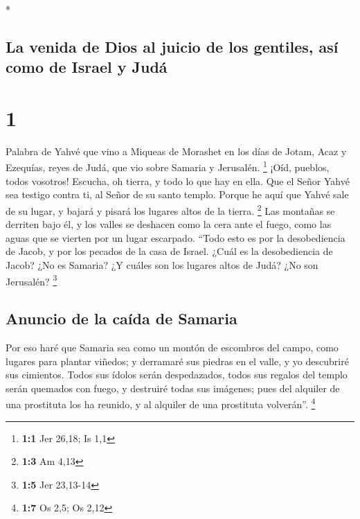 \begin{paracol}{2} \switchcolumn[0]*

\hypertarget{la-venida-de-dios-al-juicio-de-los-gentiles-asuxed-como-de-israel-y-juduxe1}{%
\subsection{La venida de Dios al juicio de los gentiles, así como de
Israel y
Judá}\label{la-venida-de-dios-al-juicio-de-los-gentiles-asuxed-como-de-israel-y-juduxe1}}

\hypertarget{section}{%
\section{1}\label{section}}

 Palabra de Yahvé que vino a Miqueas de Morashet en los
días de Jotam, Acaz y Ezequías, reyes de Judá, que vio sobre Samaria y
Jerusalén. \footnote{\textbf{1:1} Jer 26,18; Is 1,1} 
¡Oíd, pueblos, todos vosotros! Escucha, oh tierra, y todo lo que hay en
ella. Que el Señor Yahvé sea testigo contra ti, al Señor de su santo
templo.  Porque he aquí que Yahvé sale de su lugar, y
bajará y pisará los lugares altos de la tierra. \footnote{\textbf{1:3}
  Am 4,13}  Las montañas se derriten bajo él, y los valles
se deshacen como la cera ante el fuego, como las aguas que se vierten
por un lugar escarpado.  ``Todo esto es por la
desobediencia de Jacob, y por los pecados de la casa de Israel. ¿Cuál es
la desobediencia de Jacob? ¿No es Samaria? ¿Y cuáles son los lugares
altos de Judá? ¿No son Jerusalén? \footnote{\textbf{1:5} Jer 23,13-14}

\hypertarget{anuncio-de-la-cauxedda-de-samaria}{%
\subsection{Anuncio de la caída de
Samaria}\label{anuncio-de-la-cauxedda-de-samaria}}

 Por eso haré que Samaria sea como un montón de escombros
del campo, como lugares para plantar viñedos; y derramaré sus piedras en
el valle, y yo descubriré sus cimientos.  Todos sus ídolos
serán despedazados, todos sus regalos del templo serán quemados con
fuego, y destruiré todas sus imágenes; pues del alquiler de una
prostituta los ha reunido, y al alquiler de una prostituta volverán''.
\footnote{\textbf{1:7} Os 2,5; Os 2,12}


\end{paracol}
